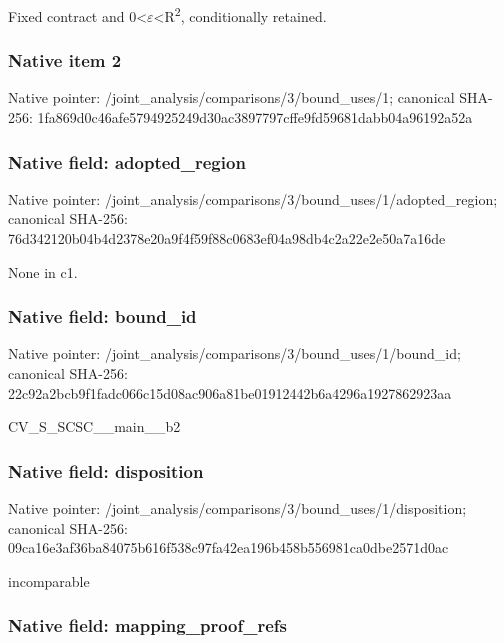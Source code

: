 \documentclass[10pt,a4paper]{article}
\begin{document}
Fixed contract and 0<\ensuremath{\varepsilon}<R\textsuperscript{2}, conditionally retained.


\subsubsection{Native item 2}


Native pointer: /joint\_analysis/comparis\allowbreak{}ons/3/bound\_uses/1; canonical SHA-256: 1fa869d0c46afe5794925249\allowbreak{}d30ac3897797cffe9fd59681\allowbreak{}dabb04a96192a52a



\subsubsection{Native field: adopted\_region}


Native pointer: /joint\_analysis/comparis\allowbreak{}ons/3/bound\_uses/1/adopt\allowbreak{}ed\_region; canonical SHA-256: 76d342120b04b4d2378e20a9\allowbreak{}f4f59f88c0683ef04a98db4c\allowbreak{}2a22e2e50a7a16de


None in c1.


\subsubsection{Native field: bound\_id}


Native pointer: /joint\_analysis/comparis\allowbreak{}ons/3/bound\_uses/1/bound\allowbreak{}\_id; canonical SHA-256: 22c92a2bcb9f1fadc066c15d\allowbreak{}08ac906a81be01912442b6a4\allowbreak{}296a1927862923aa


CV\_S\_SCSC\_\_main\_\_b2


\subsubsection{Native field: disposition}


Native pointer: /joint\_analysis/comparis\allowbreak{}ons/3/bound\_uses/1/dispo\allowbreak{}sition; canonical SHA-256: 09ca16e3af36ba84075b616f\allowbreak{}538c97fa42ea196b458b5569\allowbreak{}81ca0dbe2571d0ac


incomparable


\subsubsection{Native field: mapping\_proof\_refs}
\end{document}
